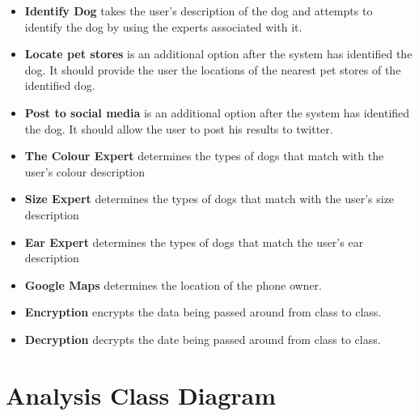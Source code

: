 \documentclass[]{article}
\begin{document}
\begin{itemize}
	
	\item \textbf{Identify Dog} takes the user's description of the dog and attempts to identify the dog by using the experts associated with it.
	  
	\item \textbf{Locate pet stores} is an additional option after the system has identified the dog.  It should provide the user the locations of the nearest pet stores of the identified dog. 
	
	\item \textbf{Post to social media} is an additional option after the system has identified the dog. It should allow the user to post his results to twitter. 
	
	\item \textbf{The Colour Expert} determines the types of dogs that match with the user's colour description
	
	\item \textbf{Size Expert} determines the types of dogs that match with the user's size description
	
	\item\textbf{Ear Expert} determines the types of dogs that match the user's ear description
	
	\item \textbf{Google Maps} determines the location of the phone owner. 
	
	\item \textbf{Encryption} encrypts the data being passed around from class to class.
	
	\item \textbf{Decryption} decrypts the date being passed around from class to class. 
	

\end{itemize}




\section{Analysis Class Diagram}
\label{sec:analysisclassdiagram}
\end{document}
